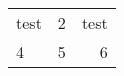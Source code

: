 \documentclass{class}
\begin{document}
\begin{tabular}{ l | c | r }
test & 2 & test \\
4 & 5 & 6 \\
\end{tabular}
\end{document}
